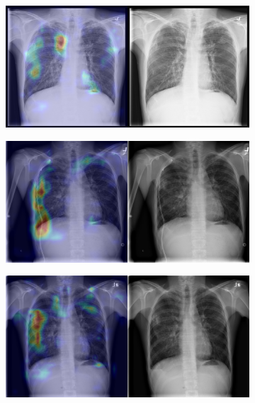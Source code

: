 \begin{figure}[b]
\begin{subfigure}{0.4\textwidth}
    \end{subfigure}
    \begin{subfigure}{0.4\textwidth}
        \centering
        \includegraphics[width=1.0\textwidth]{Chapters/5. Conclusiones/img/Pneumothorax/1_1_00001006_001.png}
    \end{subfigure}
    \begin{subfigure}{0.4\textwidth}
        \centering
        \includegraphics[width=1.0\textwidth]{Chapters/5. Conclusiones/img/Pneumothorax/1_1_00001006_015.png}
    \end{subfigure}
    \begin{subfigure}{0.4\textwidth}
        \centering
        \includegraphics[width=1.0\textwidth]{Chapters/5. Conclusiones/img/Pneumothorax/1_1_00001006_018.png}

\end{subfigure}
\end{figure}

